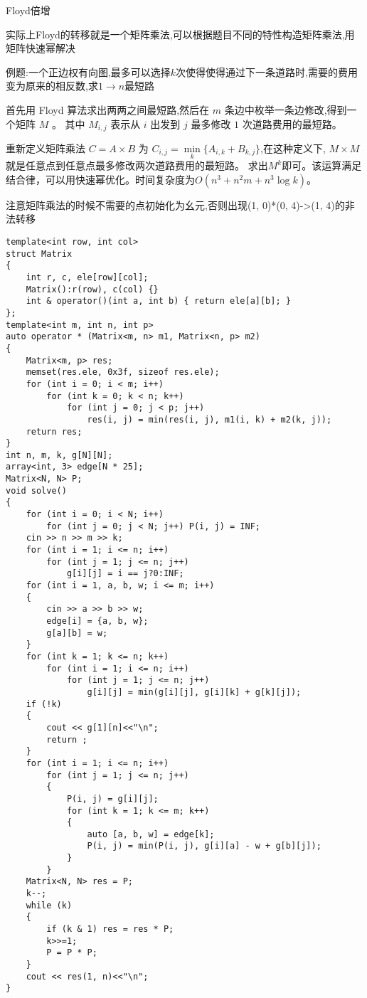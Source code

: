 \documentclass[a4paper, fontset=none]{ctexart}
\begin{document}
Floyd倍增

实际上Floyd的转移就是一个矩阵乘法,可以根据题目不同的特性构造矩阵乘法,用矩阵快速幂解决

例题:一个正边权有向图,最多可以选择$k$次使得使得通过下一条道路时,需要的费用变为原来的相反数,求$1\rightarrow n$最短路

首先用 Floyd 算法求出两两之间最短路,然后在 $m$ 条边中枚举一条边修改,得到一个矩阵 $M$ 。
其中 $M_{i, j}$ 表示从 $i$ 出发到 $j$ 最多修改 $1$ 次道路费用的最短路。

重新定义矩阵乘法 $C=A\times B$ 为 $C_{i, j}=\min\limits_k\{A_{i, k}+B_{k, j}\}$,在这种定义下,
$M\times M$ 就是任意点到任意点最多修改两次道路费用的最短路。
求出$M ^ k$即可。该运算满足结合律，可以用快速幂优化。时间复杂度为$O(n ^ 3+n ^ 2m+n ^ 3\log k)$。

注意矩阵乘法的时候不需要的点初始化为幺元,否则出现(1, 0)*(0, 4)->(1, 4)的非法转移

\begin{verbatim}
template<int row, int col>
struct Matrix
{
    int r, c, ele[row][col];
    Matrix():r(row), c(col) {}
    int & operator()(int a, int b) { return ele[a][b]; }
};
template<int m, int n, int p>
auto operator * (Matrix<m, n> m1, Matrix<n, p> m2)
{
    Matrix<m, p> res;
    memset(res.ele, 0x3f, sizeof res.ele);
    for (int i = 0; i < m; i++)
        for (int k = 0; k < n; k++)
            for (int j = 0; j < p; j++)
                res(i, j) = min(res(i, j), m1(i, k) + m2(k, j));
    return res;
}
int n, m, k, g[N][N];
array<int, 3> edge[N * 25];
Matrix<N, N> P;
void solve()
{
    for (int i = 0; i < N; i++)
        for (int j = 0; j < N; j++) P(i, j) = INF;
    cin >> n >> m >> k;
    for (int i = 1; i <= n; i++)
        for (int j = 1; j <= n; j++)
            g[i][j] = i == j?0:INF;
    for (int i = 1, a, b, w; i <= m; i++)
    {
        cin >> a >> b >> w;
        edge[i] = {a, b, w};
        g[a][b] = w;
    }
    for (int k = 1; k <= n; k++)
        for (int i = 1; i <= n; i++)
            for (int j = 1; j <= n; j++)
                g[i][j] = min(g[i][j], g[i][k] + g[k][j]);
    if (!k)
    {
        cout << g[1][n]<<"\n";
        return ;
    }
    for (int i = 1; i <= n; i++)
        for (int j = 1; j <= n; j++)
        {
            P(i, j) = g[i][j];
            for (int k = 1; k <= m; k++)
            {
                auto [a, b, w] = edge[k];
                P(i, j) = min(P(i, j), g[i][a] - w + g[b][j]);
            }
        }
    Matrix<N, N> res = P;
    k--;
    while (k)
    {
        if (k & 1) res = res * P;
        k>>=1;
        P = P * P;
    }
    cout << res(1, n)<<"\n";
}
\end{verbatim}
\end{document}
